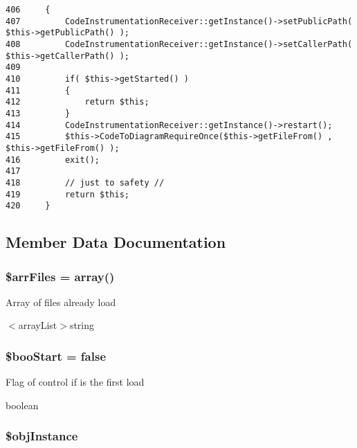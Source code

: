 \begin{Code}\begin{verbatim}406     {
407         CodeInstrumentationReceiver::getInstance()->setPublicPath( $this->getPublicPath() );
408         CodeInstrumentationReceiver::getInstance()->setCallerPath( $this->getCallerPath() );
409         
410         if( $this->getStarted() )
411         {
412             return $this;
413         }
414         CodeInstrumentationReceiver::getInstance()->restart();
415         $this->CodeToDiagramRequireOnce($this->getFileFrom() , $this->getFileFrom() );
416         exit();
417 
418         // just to safety //
419         return $this;
420     }
\end{verbatim}
\end{Code}




\subsection{Member Data Documentation}
\hypertarget{class_code_to_diagram_8e74bce736504d1da15b87b4da6da83d}{
\subsubsection[{\$arrFiles}]{\setlength{\rightskip}{0pt plus 5cm}\$arrFiles = array()}}
\label{class_code_to_diagram_8e74bce736504d1da15b87b4da6da83d}


Array of files already load

$<$arrayList$>$string \hypertarget{class_code_to_diagram_8e7e7887be9a69348bcb5ec86877ac24}{
\subsubsection[{\$booStart}]{\setlength{\rightskip}{0pt plus 5cm}\$booStart = false}}
\label{class_code_to_diagram_8e7e7887be9a69348bcb5ec86877ac24}


Flag of control if is the first load

boolean \hypertarget{class_code_to_diagram_917d057900327b25608ed26c927eac3b}{
\subsubsection[{\$objInstance}]{\setlength{\rightskip}{0pt plus 5cm}\$objInstance}}
\label{class_code_to_diagram_917d057900327b25608ed26c927eac3b}


